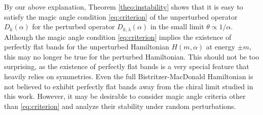 \documentclass[reqno,12pt,letterpaper]{amsart}
\numberwithin{equation}{section}
\begin{document}
By our above explanation, Theorem \ref{theo:instability} shows that it is easy to satisfy the magic angle condition \eqref{eq:criterion} of the unperturbed operator $D_k(\alpha)$ for the perturbed operator $D_{k,\lambda}(\alpha)$ in the small limit $\theta \propto 1/\alpha$. Although the magic angle condition \eqref{eq:criterion} implies the existence of perfectly flat bands for the unperturbed Hamiltonian $H(m,\alpha)$ at energy $\pm m$, this may no longer be true for the perturbed Hamiltonian. This should not be too surprising, as the existence of perfectly flat bands is a very special feature that heavily relies on symmetries. Even the full Bistritzer-MacDonald Hamiltonian is not believed to exhibit perfectly flat bands away from the chiral limit studied in this work. However, it may be desirable to consider magic angle criteria other than \eqref{eq:criterion} and analyze their stability under random perturbations.  
\end{document}
